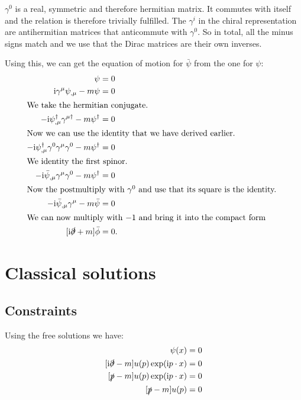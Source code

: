 \documentclass[11pt, english, fleqn, DIV=15, headinclude, BCOR=1cm]{scrartcl}
\begin{document}
$\gamma^0$ is a real, symmetric and therefore hermitian matrix. It commutes
with itself and the relation is therefore trivially fulfilled. The $\gamma^i$
in the chiral representation are antihermitian matrices that anticommute with
$\gamma^0$. So in total, all the minus signs match and we use that the Dirac
matrices are their own inverses.

Using this, we can get the equation of motion for $\bar\psi$ from the one for
$\psi$:
\begin{align*}
    [\iup \slashed\partial - m] \psi &= 0 \\
    \iup \gamma^\mu \psi_{,\mu} - m \psi &= 0 \\
    \intertext{%
        We take the hermitian conjugate.
    }
    - \iup \psi_{,\mu}^\dagger \gamma^{\mu\dagger} - m \psi^\dagger &= 0 \\
    \intertext{%
        Now we can use the identity that we have derived earlier.
    }
    - \iup \psi_{,\mu}^\dagger \gamma^0 \gamma^\mu \gamma^0 - m \psi^\dagger &= 0 \\
    \intertext{%
        We identity the first spinor.
    }
    - \iup \bar\psi_{,\mu} \gamma^\mu \gamma^0 - m \psi^\dagger &= 0 \\
    \intertext{%
        Now the postmultiply with $\gamma^0$ and use that its square is the
        identity.
    }
    - \iup \bar\psi_{,\mu} \gamma^\mu - m \bar\psi &= 0 \\
    \intertext{%
        We can now multiply with $-1$ and bring it into the compact form
    }
    [\iup \slashed\partial + m] \bar\phi &= 0.
\end{align*}

\section{Classical solutions}
\label{homework:2}

\subsection{Constraints}

Using the free solutions we have:
\begin{align*}
    [\iup \slashed\partial - m] \psi(x) &= 0 \\
    [\iup \slashed\partial - m] u(p) \exp(\iup p \cdot x) &= 0 \\
    [\slashed p - m] u(p) \exp(\iup p \cdot x) &= 0 \\
    [\slashed p - m] u(p) &= 0
\end{align*}
\end{document}
